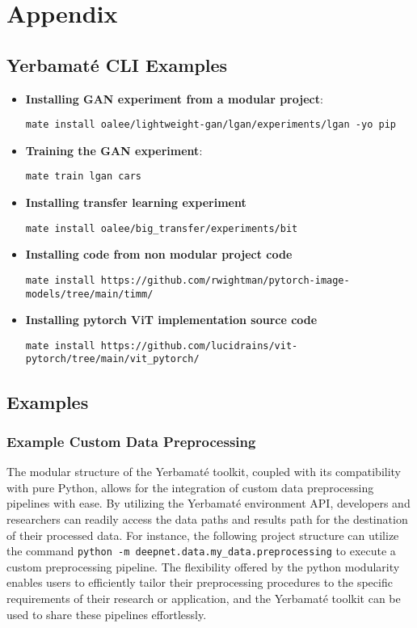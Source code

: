 

\onecolumn

\section{Appendix}







\subsection{Yerbamaté CLI Examples}

\begin{itemize}
    \item \textbf{Installing GAN experiment from a modular project}: 
    
    \texttt{mate install oalee/lightweight-gan/lgan/experiments/lgan -yo pip}
    \item \textbf{Training the GAN experiment}: 
    
    \texttt{mate train lgan cars}
    
    \item \textbf{Installing transfer learning experiment}

    \texttt{mate install oalee/big\_transfer/experiments/bit}
    
    \item \textbf{Installing code from non modular project code}

    \texttt{mate install https://github.com/rwightman/pytorch-image-models/tree/main/timm/}

    \item \textbf{Installing pytorch ViT implementation source code}
    
    \texttt{mate install https://github.com/lucidrains/vit-pytorch/tree/main/vit\_pytorch/}

\end{itemize}


\subsection{Examples}

\subsubsection{Example Custom Data Preprocessing}
The modular structure of the Yerbamaté toolkit, coupled with its compatibility with pure Python, allows for the integration of custom data preprocessing pipelines with ease. By utilizing the Yerbamaté environment API, developers and researchers can readily access the data paths and results path for the destination of their processed data. For instance, the following project structure can utilize the command \texttt{python -m deepnet.data.my\_data.preprocessing} to execute a custom preprocessing pipeline. The flexibility offered by the python modularity enables users to efficiently tailor their preprocessing procedures to the specific requirements of their research or application, and the Yerbamaté toolkit can be used to share these pipelines effortlessly.

